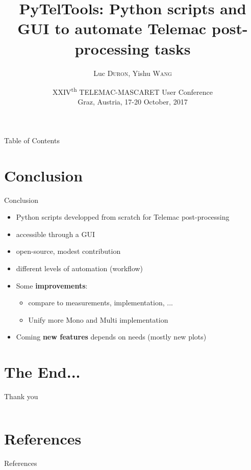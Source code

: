 \documentclass{beamer}
\title[PyTelTools]{PyTelTools: Python scripts and GUI to automate Telemac post-processing tasks}
\author{Luc \textsc{Duron}, Yishu \textsc{Wang}}
\institute[CNR]{Compagnie Nationale du Rhône (CNR)}
\date[XXIV\textsuperscript{th} TUC - Oct. 2017]{
  {\tiny XXIV\textsuperscript{th} \textsc{TELEMAC-MASCARET} User Conference\\
    Graz, Austria, 17-20 October, 2017}
}
\begin{document}
\begin{frame}
  \titlepage
\end{frame}


\begin{frame}{Table of Contents}
  \tableofcontents
\end{frame}











\section{Conclusion}

\begin{frame}{Conclusion}
  \begin{itemize}
    \item Python scripts developped from scratch for Telemac post-processing
    \item accessible through a GUI
    \item open-source, modest contribution
    \item different levels of automation (workflow)
    \item Some \textbf{improvements}:
      \begin{itemize}
        \item compare to measurements, implementation, ...
        \item Unify more Mono and Multi implementation
      \end{itemize}
    \item Coming \textbf{new features} depends on needs (mostly new plots)
  \end{itemize}
\end{frame}

\section*{The End...}

\begin{frame}

\begin{center}
  {\huge Thank you}
  \vspace{1cm}
  \inputminted[fontsize=\Large,xleftmargin=0.4cm]{python}{ending.py}
\end{center}

\end{frame}

\section*{References}
\nocite{internship_report}\nocite{def_math}\nocite{equations}

\begin{frame} %
  {References}
  {\small
  
  }
\end{frame}
\end{document}
